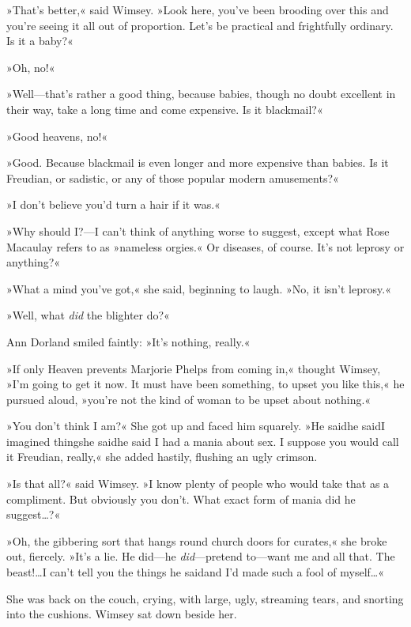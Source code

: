 »That's better,« said Wimsey. »Look here, you've been brooding over this and you're seeing it all out of proportion. Let's be practical and frightfully ordinary. Is it a baby?«

»Oh, no!«

»Well—that's rather a good thing, because babies, though no doubt excellent in their way, take a long time and come expensive. Is it blackmail?«

»Good heavens, no!«

»Good. Because blackmail is even longer and more expensive than babies. Is it Freudian, or sadistic, or any of those popular modern amusements?«

»I don't believe you'd turn a hair if it was.«

»Why should I?—I can't think of anything worse to suggest, except what Rose Macaulay refers to as »nameless orgies.« Or diseases, of course. It's not leprosy or anything?«

»What a mind you've got,« she said, beginning to laugh. »No, it isn't leprosy.«

»Well, what \textit{did} the blighter do?«

Ann Dorland smiled faintly: »It's nothing, really.«

»If only Heaven prevents Marjorie Phelps from coming in,« thought Wimsey, »I'm going to get it now\textellipsis. It must have been something, to upset you like this,« he pursued aloud, »you're not the kind of woman to be upset about nothing.«

»You don't think I am?« She got up and faced him squarely. »He said\textellipsis  he said\textellipsis  I imagined things\textellipsis  he said\textellipsis  he said I had a mania about sex. I suppose you would call it Freudian, really,« she added hastily, flushing an ugly crimson.

»Is that all?« said Wimsey. »I know plenty of people who would take that as a compliment\textellipsis. But obviously you don't. What exact form of mania did he suggest\dots?«

»Oh, the gibbering sort that hangs round church doors for curates,« she broke out, fiercely. »It's a lie. He did—he \textit{did}—pretend to—want me and all that. The beast!\dots I can't tell you the things he said\textellipsis  and I'd made such a fool of myself\dots«

She was back on the couch, crying, with large, ugly, streaming tears, and snorting into the cushions. Wimsey sat down beside her.

